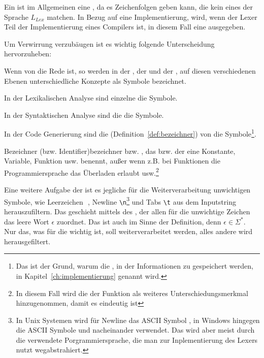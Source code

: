 Ein  ist im Allgemeinen eine , da es Zeichenfolgen geben kann, die kein  eines  der Sprache $L_{Lex}$ matchen. In Bezug auf eine Implementierung, wird, wenn der Lexer Teil der Implementierung eines Compilers ist, in diesem Fall eine  ausgegeben.

\begin{Special_Paragraph}
  Um Verwirrung verzubäugen ist es wichtig folgende Unterscheidung hervorzuheben:

  Wenn von  die Rede ist, so werden in der , der  und der , auf diesen verschiedenen Ebenen unterschiedliche Konzepte als Symbole bezeichnet.

  In der Lexikalischen Analyse sind einzelne  die Symbole.

  In der Syntaktischen Analyse sind die  die Symbole.

  In der Code Generierung sind die  (Definition~\ref{def:bezeichner}) von  die Symbole\footnote{Das ist der Grund, warum die , in der Informationen zu  gespeichert werden, in Kapitel~\ref{ch:implementierung}  genannt wird.}.
\end{Special_Paragraph}

\begin{Definition}{Bezeichner (bzw. Identifier)}{bezeichner}
   bzw. , das bzw. der eine Konstante, Variable, Funktion usw.  benennt, außer wenn z.B. bei Funktionen die Programmiersprache das Überladen erlaubt usw.\footnote{In diesem Fall wird die  der Funktion als weiteres Unterschiedungsmerkmal hinzugenommen, damit es eindeutig ist}
\end{Definition}

Eine weitere Aufgabe der  ist es jegliche für die Weiterverarbeitung unwichtigen Symbole, wie Leerzeichen \,\textvisiblespace\,, Newline \verb|\n|\footnote{In Unix Systemen wird für Newline das ASCII Symbol , in Windows hingegen die ASCII Symbole  und  nacheinander verwendet. Das wird aber meist durch die verwendete Porgrammiersprache, die man zur Inplementierung des Lexers nutzt wegabstrahiert.} und Tabs \verb|\t| aus dem Inputstring herauszufiltern. Das geschieht mittels des , der allen für die  unwichtige Zeichen das leere Wort $\epsilon$ zuordnet. Das ist auch im Sinne der Definition, denn $\epsilon \in \Sigma^{*}$.
Nur das, was für die  wichtig ist, soll weiterverarbeitet werden, alles andere wird herausgefiltert.

